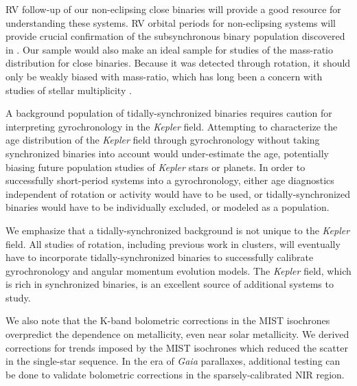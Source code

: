 \documentclass[manuscript]{aastex6}
\newcommand{\Kepler}{\mbox{\textit{Kepler}}}
\newcommand{\Gaia}{\mbox{\textit{Gaia}}}
\begin{document}
RV follow-up of our non-eclipsing close binaries will provide a good resource
for understanding these systems. RV orbital periods for non-eclipsing systems 
will provide crucial confirmation of the subsynchronous binary population 
discovered in \citet{Lurie17}. Our sample would also make an ideal sample for
studies of the mass-ratio distribution for close binaries. Because it was
detected through rotation, it should only be weakly biased with mass-ratio,
which has long been a concern with studies of stellar multiplicity
\citep{Halbwachs03}.



A background population of tidally-synchronized binaries requires caution for
interpreting gyrochronology in the \Kepler{} field. Attempting to characterize
the age distribution of the \Kepler{} field through gyrochronology without 
taking synchronized binaries into account would under-estimate the age, 
potentially biasing future population studies of \Kepler{} stars or planets. 
In order to successfully short-period systems into a gyrochronology, either age 
diagnostics independent of rotation or activity would have to be used, or
tidally-synchronized binaries would have to be individually excluded, or
modeled as a population.

We emphasize that a tidally-synchronized background is not unique to the
\Kepler{} field. All studies of rotation, including previous work in clusters,
will eventually have to incorporate tidally-synchronized binaries to
successfully calibrate gyrochronology and angular momentum evolution models.
The \Kepler{} field, which is rich in synchronized binaries, is an excellent 
source of additional systems to study.

We also note that the K-band bolometric corrections in the MIST isochrones
overpredict the dependence on metallicity, even near solar metallicity. We
derived corrections for trends imposed by the MIST isochrones which reduced the
scatter in the single-star sequence. In the era of \Gaia{} parallaxes,
additional testing can be done to validate bolometric corrections in the
sparsely-calibrated NIR region.

\acknowledgments
\end{document}
